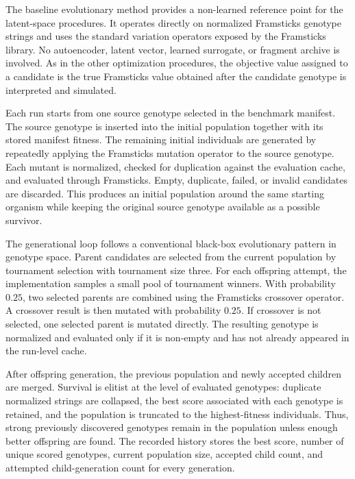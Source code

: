 The baseline evolutionary method provides a non-learned reference point for the latent-space procedures. It operates directly on normalized Framsticks \fone{} genotype strings and uses the standard variation operators exposed by the Framsticks library. No autoencoder, latent vector, learned surrogate, or fragment archive is involved. As in the other optimization procedures, the objective value assigned to a candidate is the true Framsticks \vertpos{} value obtained after the candidate genotype is interpreted and simulated.

Each run starts from one source genotype selected in the benchmark manifest. The source genotype is inserted into the initial population together with its stored manifest fitness. The remaining initial individuals are generated by repeatedly applying the Framsticks mutation operator to the source genotype. Each mutant is normalized, checked for duplication against the evaluation cache, and evaluated through Framsticks. Empty, duplicate, failed, or invalid candidates are discarded. This produces an initial population around the same starting organism while keeping the original source genotype available as a possible survivor.

The generational loop follows a conventional black-box evolutionary pattern in genotype space. Parent candidates are selected from the current population by tournament selection with tournament size three. For each offspring attempt, the implementation samples a small pool of tournament winners. With probability \(0.25\), two selected parents are combined using the Framsticks crossover operator. A crossover result is then mutated with probability \(0.25\). If crossover is not selected, one selected parent is mutated directly. The resulting genotype is normalized and evaluated only if it is non-empty and has not already appeared in the run-level cache.

After offspring generation, the previous population and newly accepted children are merged. Survival is elitist at the level of evaluated genotypes: duplicate normalized strings are collapsed, the best score associated with each genotype is retained, and the population is truncated to the highest-fitness individuals. Thus, strong previously discovered genotypes remain in the population unless enough better offspring are found. The recorded history stores the best score, number of unique scored genotypes, current population size, accepted child count, and attempted child-generation count for every generation.

